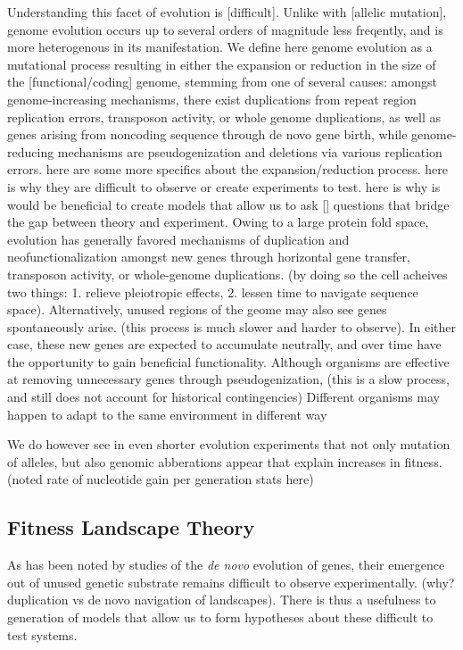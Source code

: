 \documentclass[paper=a4, fontsize=11pt,twoside]{scrartcl}       %
\begin{document}
Understanding this facet of evolution is [difficult]. Unlike with [allelic mutation], genome evolution occurs up to several orders of magnitude less freqently, and is more heterogenous in its manifestation. We define here genome evolution as a mutational process resulting in either the expansion or reduction in the size of the [functional/coding] genome, stemming from one of several causes: amongst genome-increasing mechanisms, there exist duplications from repeat region replication errors, transposon activity, or whole genome duplications, as well as genes arising from noncoding sequence through de novo gene birth, while genome-reducing mechanisms are pseudogenization and deletions via various replication errors. here are some more specifics about the expansion/reduction process. here is why they are difficult to observe or create experiments to test. here is why is would be beneficial to create models that allow us to ask [] questions that bridge the gap between theory and experiment. 
Owing to a large protein fold space, evolution has generally favored mechanisms of duplication and neofunctionalization amongst new genes through horizontal gene transfer, transposon activity, or whole-genome duplications. (by doing so the cell acheives two things: 1. relieve pleiotropic effects, 2. lessen time to navigate sequence space). Alternatively, unused regions of the geome may also see genes spontaneously arise. (this process is much slower and harder to observe). In either case, these new genes are expected to accumulate neutrally, and over time have the opportunity to gain beneficial functionality. 
Although organisms are effective at removing unnecessary genes through pseudogenization, (this is a slow process, and still does not account for historical contingencies)
Different organisms may happen to adapt to the same environment in different way

We do however see in even shorter evolution experiments that not only mutation of alleles, but also genomic abberations appear that explain increases in fitness. (noted rate of nucleotide gain per generation stats here)
\subsection*{Fitness Landscape Theory}

As has been noted by studies of the \textit{de novo} evolution of genes, their emergence out of unused genetic substrate remains difficult to observe experimentally. (why? duplication vs de novo navigation of landscapes). There is thus a usefulness to generation of models that allow us to form hypotheses about these difficult to test systems.
\end{document}
